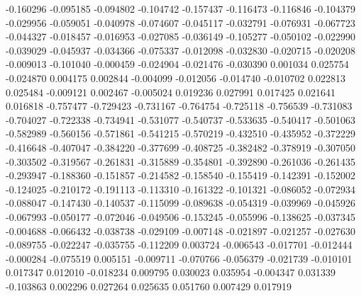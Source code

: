 -0.160296
-0.095185
-0.094802
-0.104742
-0.157437
-0.116473
-0.116846
-0.104379
-0.029956
-0.059051
-0.040978
-0.074607
-0.045117
-0.032791
-0.076931
-0.067723
-0.044327
-0.018457
-0.016953
-0.027085
-0.036149
-0.105277
-0.050102
-0.022990
-0.039029
-0.045937
-0.034366
-0.075337
-0.012098
-0.032830
-0.020715
-0.020208
-0.009013
-0.101040
-0.000459
-0.024904
-0.021476
-0.030390
0.001034
0.025754
-0.024870
0.004175
0.002844
-0.004099
-0.012056
-0.014740
-0.010702
0.022813
0.025484
-0.009121
0.002467
-0.005024
0.019236
0.027991
0.017425
0.021641
0.016818
-0.757477
-0.729423
-0.731167
-0.764754
-0.725118
-0.756539
-0.731083
-0.704027
-0.722338
-0.734941
-0.531077
-0.540737
-0.533635
-0.540417
-0.501063
-0.582989
-0.560156
-0.571861
-0.541215
-0.570219
-0.432510
-0.435952
-0.372229
-0.416648
-0.407047
-0.384220
-0.377699
-0.408725
-0.382482
-0.378919
-0.307050
-0.303502
-0.319567
-0.261831
-0.315889
-0.354801
-0.392890
-0.261036
-0.261435
-0.293947
-0.188360
-0.151857
-0.214582
-0.158540
-0.155419
-0.142391
-0.152002
-0.124025
-0.210172
-0.191113
-0.113310
-0.161322
-0.101321
-0.086052
-0.072934
-0.088047
-0.147430
-0.140537
-0.115099
-0.089638
-0.054319
-0.039969
-0.045926
-0.067993
-0.050177
-0.072046
-0.049506
-0.153245
-0.055996
-0.138625
-0.037345
-0.004688
-0.066432
-0.038738
-0.029109
-0.007148
-0.021897
-0.021257
-0.027630
-0.089755
-0.022247
-0.035755
-0.112209
0.003724
-0.006543
-0.017701
-0.012444
-0.000284
-0.075519
0.005151
-0.009711
-0.070766
-0.056379
-0.021739
-0.010101
0.017347
0.012010
-0.018234
0.009795
0.030023
0.035954
-0.004347
0.031339
-0.103863
0.002296
0.027264
0.025635
0.051760
0.007429
0.017919
